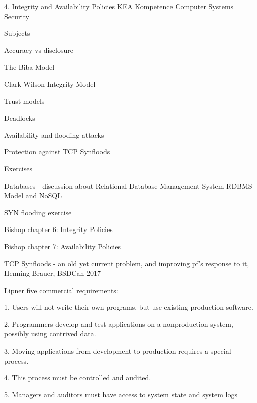 \documentclass[Screen16to9,17pt]{foils}
\begin{document}
\mytitlepage
{4. Integrity and Availability Policies}
{KEA Kompetence Computer Systems Security \the\year}



\begin{list1}
\item Subjects
\begin{list2}
\item Accuracy vs disclosure
\item The Biba Model
\item Clark-Wilson Integrity Model
\item Trust models
\item Deadlocks
\item Availability and flooding attacks
\item Protection against TCP Synfloods
\end{list2}
\item Exercises
\begin{list2}
\item Databases - discussion about Relational Database Management System RDBMS Model and NoSQL
\item SYN flooding exercise
\end{list2}
\end{list1}




\begin{list1}
\item Bishop chapter 6: Integrity Policies
\item Bishop chapter 7: Availability Policies
\item TCP Synfloods - an old yet current problem, and improving pf's response to it, Henning Brauer, BSDCan 2017
\end{list1}


Lipner five commercial requirements:
\begin{list2}
\item[1.] Users will not write their own programs, but use existing
  production software.
\item[2.] Programmers develop and test applications on a nonproduction system, possibly using contrived data.
\item[3.] Moving applications from development to production requires a special process.
\item[4.] This process must be controlled and audited.
\item[5.] Managers and auditors must have access to system state and system logs
\end{list2}
\end{document}
